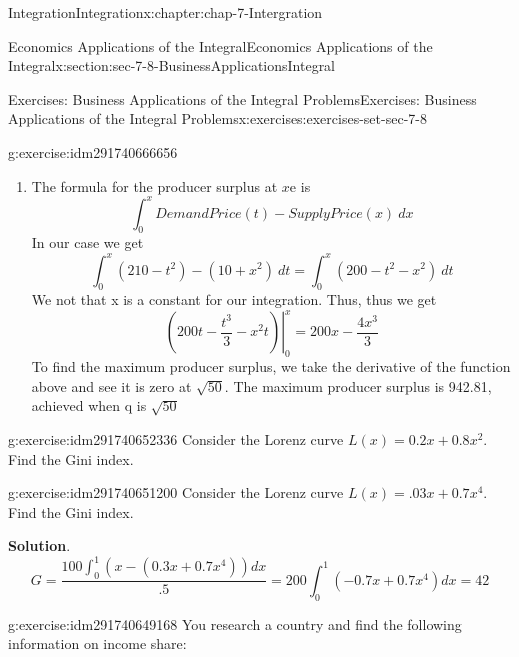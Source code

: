 \documentclass[oneside,10pt,]{book}
\numberwithin{equation}{section}
\begin{document}
\begin{chapterptx}{Integration}{}{Integration}{}{}{x:chapter:chap-7-Intergration}
\begin{sectionptx}{Economics Applications of the Integral}{}{Economics Applications of the Integral}{}{}{x:section:sec-7-8-BusinessApplicationsIntegral}
\begin{exercises-subsection}{Exercises: Business Applications of the Integral Problems}{}{Exercises: Business Applications of the Integral Problems}{}{}{x:exercises:exercises-set-sec-7-8}
\begin{divisionexercise}{9}{}{}{g:exercise:idm291740666656}
\begin{enumerate}[label=(\alph*)]
%
\begin{equation*}
ProdSurplus=
\int_0^{5}
(185)-
(10+q^2)\ dx=\frac{2500}{3}.
\end{equation*}
%
\begin{equation*}
ConsSurplus=
\int_0^{5}
(210-q^2)\ dx=\frac{250}{3}.
\end{equation*}
%
\begin{equation*}
TotalSocialGain=ProdSurplus+ConsSurplus=\frac{2750}{3}.
\end{equation*}
%
\item{}The formula for the producer surplus at \(x\)e is%
%
\begin{equation*}
\int_0^x DemandPrice(t)-SupplyPrice(x)\ dx
\end{equation*}
In our case we get%
%
\begin{equation*}
\int_0^x (210-t^2)-(10+x^2) \ dt=\int_0^x(200-t^2-x^2) \ dt
\end{equation*}
We not that x is a constant for our integration.  Thus, thus we get%
%
\begin{equation*}
\left.\left({200t-\frac{t^3}{3}-x^2t}\right)\right|_0^x=200x-\frac{4x^3}{3}
\end{equation*}
To find the maximum producer surplus, we take the derivative of the function above and see it is zero at \(\sqrt{50}\).  The maximum producer surplus is 942.81, achieved when q is \(\sqrt{50}\)%
\end{enumerate}
\end{divisionexercise}%
\begin{divisionexercise}{10}{}{}{g:exercise:idm291740652336}%
Consider the Lorenz curve \(L(x)=0.2x+0.8x^2\).  Find the Gini index.%
\end{divisionexercise}%
\begin{divisionexercise}{11}{}{}{g:exercise:idm291740651200}%
Consider the Lorenz curve \(L(x)=.03x+0.7x^4\).  Find the Gini index.%
\par\smallskip%
\noindent\textbf{Solution}.\hypertarget{g:solution:idm291740650064}{}\quad{}%
\begin{equation*}
G=\frac{100 \int_0^1(x-(0.3x+0.7x^4))dx}{.5}
=200 \int_0^1(-0.7x+0.7x^4)dx=42
\end{equation*}
\end{divisionexercise}%
\begin{divisionexercise}{12}{}{}{g:exercise:idm291740649168}%
You research a country and find the following information on income share:%
\begin{sidebyside}{1}{0}{0}{0}%
\begin{sbspanel}{1}%

\end{sbspanel}
\end{sidebyside}
\end{divisionexercise}
\end{exercises-subsection}
\end{sectionptx}
\end{chapterptx}
\end{document}
